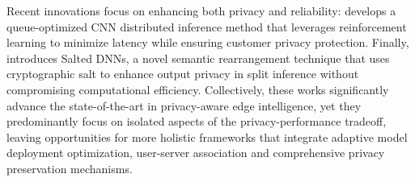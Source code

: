Recent innovations focus on enhancing both privacy and reliability: \cite{c41} develops a queue-optimized CNN distributed inference method that leverages reinforcement learning to minimize latency while ensuring customer privacy protection. Finally, \cite{c42} introduces Salted DNNs, a novel semantic rearrangement technique that uses cryptographic salt to enhance output privacy in split inference without compromising computational efficiency. Collectively, these works significantly advance the state-of-the-art in privacy-aware edge intelligence, yet they predominantly focus on isolated aspects of the privacy-performance tradeoff, leaving opportunities for more holistic frameworks that integrate adaptive model deployment optimization, user-server association and comprehensive privacy preservation mechanisms.
